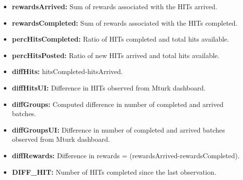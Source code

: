 \begin{itemize}[noitemsep]
\item \textbf{rewardsArrived:} Sum of rewards associated with the HITs arrived.
\item \textbf{rewardsCompleted:} Sum of rewards associated with the HITs completed.
\item \textbf{percHitsCompleted:} Ratio of HITs completed and total hits available.
\item \textbf{percHitsPosted:} Ratio of new HITs arrived and total hits available.
\item \textbf{diffHits:} hitsCompleted-hitsArrived.
\item \textbf{diffHitsUI:} Difference in HITs observed from Mturk dashboard.
\item \textbf{diffGroups:} Computed difference in number of completed and arrived batches.
\item \textbf{diffGroupsUI:} Difference in number of completed and arrived batches observed from Mturk dashboard.
\item \textbf{diffRewards:} Difference in rewards = (rewardsArrived-rewardsCompleted).
\item \textbf{DIFF\_HIT:} Number of HITs completed since the last observation.
\end{itemize}
\pagebreak